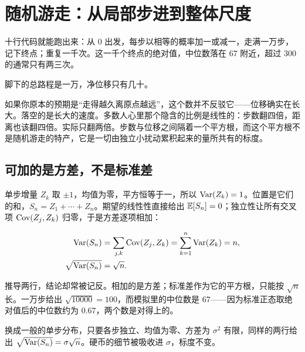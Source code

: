 \section{随机游走：从局部步进到整体尺度}
\label{sec:06-Random-Processes/04-Applications/01}

十行代码就能跑出来：从 \(0\) 出发，每步以相等的概率加一或减一，走满一万步，记下终点；重复一千次。这一千个终点的绝对值，中位数落在 \(67\) 附近，超过 \(300\) 的通常只有两三次。

脚下的总路程是一万，净位移只有几十。

如果你原本的预期是``走得越久离原点越远''，这个数并不反驳它——位移确实在长大。落空的是长大的速度。多数人心里那个隐含的比例是线性的：步数翻四倍，距离也该翻四倍。实际只翻两倍。步数与位移之间隔着一个平方根，而这个平方根不是随机游走的特产，它是一切由独立小扰动累积起来的量所共有的标度。

\subsection{可加的是方差，不是标准差}

单步增量 \(Z_k\) 取 \(\pm1\)，均值为零，平方恒等于一，所以 \(\operatorname{Var}(Z_k)=1\)。位置是它们的和，\(S_n=Z_1+\cdots+Z_n\)。期望的线性性直接给出 \(\mathbb{E}[S_n]=0\)；独立性让所有交叉项 \(\operatorname{Cov}(Z_j,Z_k)\) 归零，于是方差逐项相加：

\[
\begin{aligned}
\operatorname{Var}(S_n)&=\sum_{j,k}\operatorname{Cov}(Z_j,Z_k)=\sum_{k=1}^{n}\operatorname{Var}(Z_k)=n,\\
\sqrt{\operatorname{Var}(S_n)}&=\sqrt n.
\end{aligned}
\]

推导两行，结论却常被记反。相加的是方差；标准差作为它的平方根，只能按 \(\sqrt n\) 长。一万步给出 \(\sqrt{10000}=100\)，而模拟里的中位数是 \(67\)——因为标准正态取绝对值后的中位数约为 \(0.67\)，两个数是对得上的。

换成一般的单步分布，只要各步独立、均值为零、方差为 \(\sigma^2\) 有限，同样的两行给出 \(\sqrt{\operatorname{Var}(S_n)}=\sigma\sqrt n\)。硬币的细节被吸收进 \(\sigma\)，标度不变。

